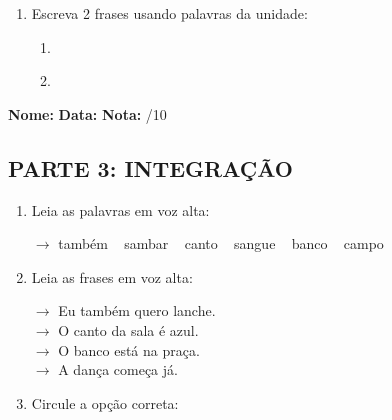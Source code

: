 \begin{exercicio}
\begin{enumerate}[resume]
  \item Escreva 2 frases usando palavras da unidade:
  \begin{enumerate}[label=\alph*)]
    \item \underline{\hspace{8cm}}
    \item \underline{\hspace{8cm}}
  \end{enumerate}

\end{enumerate}

\end{exercicio}



\begin{exercicio}

\noindent\textbf{Nome:} \underline{\hspace{3.2cm}} \quad \textbf{Data:} \underline{\hspace{1.6cm}} \quad \textbf{Nota:} \underline{\hspace{0.9cm}}/10


\subsection*{PARTE 3: INTEGRAÇÃO}

\begin{enumerate}[resume]

  \item Leia as palavras em voz alta:
  \begin{center}
  $\rightarrow$ também ~ sambar ~ canto ~ sangue ~ banco ~ campo
  \end{center}

  \item Leia as frases em voz alta:
  \begin{center}
  $\rightarrow$ Eu também quero lanche.\\
  $\rightarrow$ O canto da sala é azul.\\
  $\rightarrow$ O banco está na praça.\\
  $\rightarrow$ A dança começa já.\\
  \end{center}

  \item Circule a opção correta:
  \begin{enumerate}[label=(\alph*)]


\end{enumerate}
\end{enumerate}
\end{exercicio}
